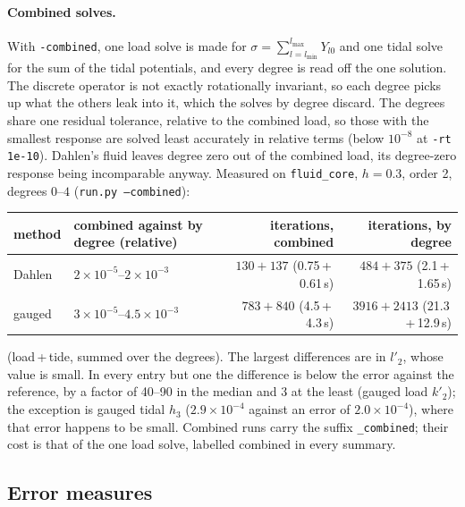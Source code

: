 \documentclass[11pt]{article}
\numberwithin{equation}{section}
\newcommand{\code}[1]{\texttt{#1}}
\begin{document}
\paragraph{Combined solves.}
With \code{-combined}, one load solve is made for
$\sigma=\sum_{l=l_{\min}}^{l_{\max}}Y_{l0}$ and one tidal solve for the sum of
the tidal potentials, and every degree is read off the one solution. The
discrete operator is not exactly rotationally invariant, so each degree
picks up what the others leak into it, which the solves by degree discard.
The degrees share one residual tolerance, relative to the combined load, so
those with the smallest response are solved least accurately in relative
terms (below $10^{-8}$ at \code{-rt 1e-10}). Dahlen's fluid leaves degree
zero out of the combined load, its degree-zero response being incomparable
anyway. Measured on \code{fluid\_core}, $h=0.3$, order 2, degrees $0$--$4$
(\code{run.py --combined}):
\begin{center}
\small
\begin{tabular}{@{}lP{5.3cm}rr@{}}
\toprule
method & combined against by degree (relative) & iterations, combined & iterations, by degree \\
\midrule
Dahlen & $2\times10^{-5}$--$2\times10^{-3}$ & $130+137$ (0.75\,+\,0.61\,s) & $484+375$ (2.1\,+\,1.65\,s) \\
gauged & $3\times10^{-5}$--$4.5\times10^{-3}$ & $783+840$ (4.5\,+\,4.3\,s) & $3916+2413$ (21.3\,+\,12.9\,s) \\
\bottomrule
\end{tabular}
\end{center}
(load\,+\,tide, summed over the degrees). The largest differences are in
$l'_2$, whose value is small. In every entry but one the difference is
below the error against the reference, by a factor of 40--90 in the median
and 3 at the least (gauged load $k'_2$); the exception is gauged tidal $h_3$
($2.9\times10^{-4}$ against an error of $2.0\times10^{-4}$), where that
error happens to be small. Combined runs carry the suffix \code{\_combined};
their cost is that of the one load solve, labelled combined in every
summary.

\subsection{Error measures}
\label{sec:metrics}
\end{document}
